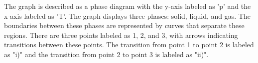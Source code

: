 The graph is described as a phase diagram with the y-axis labeled as 'p' and the x-axis labeled as 'T'. The graph displays three phases: solid, liquid, and gas. The boundaries between these phases are represented by curves that separate these regions. There are three points labeled as 1, 2, and 3, with arrows indicating transitions between these points. The transition from point 1 to point 2 is labeled as "i)" and the transition from point 2 to point 3 is labeled as "ii)".